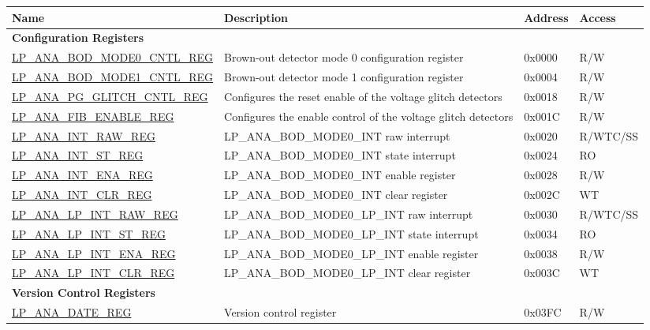 \begin{longtable}{ | l | p{7.2cm} | l | l | }
\hline\rowcolor{lightgray}
\textbf{Name} & \textbf{Description} &  \textbf{Address} & \textbf{Access} \\ \hline
\endhead
\multicolumn{4}{|l|}{\textbf{Configuration Registers}} \\ \hline
\hyperref[regdesc:LPANABODMODE0CNTLREG]{LP\_ANA\_BOD\_MODE0\_CNTL\_REG} & Brown-out detector mode 0 configuration register & 0x0000 & R/W \\ \hline
\hyperref[regdesc:LPANABODMODE1CNTLREG]{LP\_ANA\_BOD\_MODE1\_CNTL\_REG} & Brown-out detector mode 1 configuration register & 0x0004 & R/W \\ \hline
\hyperref[regdesc:LPANAPGGLITCHCNTLREG]{LP\_ANA\_PG\_GLITCH\_CNTL\_REG} & Configures the reset enable of the voltage glitch detectors & 0x0018 & R/W \\ \hline
\hyperref[regdesc:LPANAFIBENABLEREG]{LP\_ANA\_FIB\_ENABLE\_REG} & Configures the enable control of the voltage glitch detectors & 0x001C & R/W \\ \hline
\hyperref[regdesc:LPANAINTRAWREG]{LP\_ANA\_INT\_RAW\_REG} & LP\_ANA\_BOD\_MODE0\_INT raw interrupt & 0x0020 & R/WTC/SS \\ \hline
\hyperref[regdesc:LPANAINTSTREG]{LP\_ANA\_INT\_ST\_REG} & LP\_ANA\_BOD\_MODE0\_INT state interrupt & 0x0024 & RO \\ \hline
\hyperref[regdesc:LPANAINTENAREG]{LP\_ANA\_INT\_ENA\_REG} & LP\_ANA\_BOD\_MODE0\_INT enable register & 0x0028 & R/W \\ \hline
\hyperref[regdesc:LPANAINTCLRREG]{LP\_ANA\_INT\_CLR\_REG} & LP\_ANA\_BOD\_MODE0\_INT clear register & 0x002C & WT \\ \hline
\hyperref[regdesc:LPANALPINTRAWREG]{LP\_ANA\_LP\_INT\_RAW\_REG} & LP\_ANA\_BOD\_MODE0\_LP\_INT raw interrupt & 0x0030 & R/WTC/SS \\ \hline
\hyperref[regdesc:LPANALPINTSTREG]{LP\_ANA\_LP\_INT\_ST\_REG} & LP\_ANA\_BOD\_MODE0\_LP\_INT state interrupt & 0x0034 & RO \\ \hline
\hyperref[regdesc:LPANALPINTENAREG]{LP\_ANA\_LP\_INT\_ENA\_REG} & LP\_ANA\_BOD\_MODE0\_LP\_INT enable register & 0x0038 & R/W \\ \hline
\hyperref[regdesc:LPANALPINTCLRREG]{LP\_ANA\_LP\_INT\_CLR\_REG} & LP\_ANA\_BOD\_MODE0\_LP\_INT clear register & 0x003C & WT \\ \hline
\multicolumn{4}{|l|}{\textbf{Version Control Registers}} \\ \hline
\hyperref[regdesc:LPANADATEREG]{LP\_ANA\_DATE\_REG} & Version control register & 0x03FC & R/W \\ \hline
\end{longtable}
